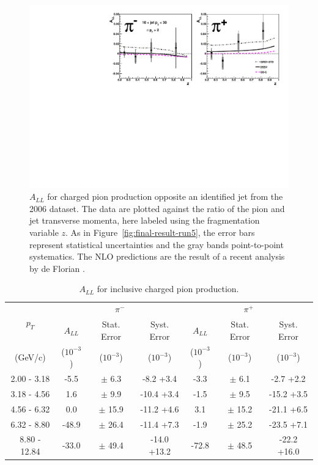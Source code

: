 \begin{figure}[]
  \includegraphics[width=1.0\textwidth]{figures/final-result-run6-4}
  \caption{$A_{LL}$ for charged pion production opposite an identified jet from the 2006 dataset.  The data are plotted against the ratio of the pion and jet transverse momenta, here labeled using the fragmentation variable $z$.  As in Figure~\ref{fig:final-result-run5}, the error bars represent statistical uncertainties and the gray bands point-to-point systematics.  The NLO predictions are the result of a recent analysis by de Florian \cite{deFlorian:2009fw}.}
  \label{fig:final-result-run6}
\end{figure}

\begin{table}
  \centering
  \begin{tabular}{|c||c|c|c||c|c|c|}
    \hline
    \multirow{2}{*}{$p_T$} & \multicolumn{3}{c||}{$\pi^{-}$} & \multicolumn{3}{c|}{$\pi^{+}$} \\
    \cline{2-7}
    & $A_{LL}$ & Stat. Error & Syst. Error &$A_{LL}$ & Stat. Error & Syst. Error\\
    (GeV/c) & ($10^{-3}$) & ($10^{-3}$) & ($10^{-3}$) & ($10^{-3}$) & ($10^{-3}$) & ($10^{-3}$) \\
    \hline
    \hline
    2.00 - 3.18 & -5.5 & $\pm$ 6.3 & -8.2 +3.4 &  -3.3 & $\pm$ 6.1 & -2.7 +2.2\\
    3.18 - 4.56 & 1.6 & $\pm$ 9.9 & -10.4 +3.4 &  -1.5 & $\pm$ 9.5 & -15.2 +3.5\\
    4.56 - 6.32 & 0.0 & $\pm$ 15.9 & -11.2 +4.6 &  3.1 & $\pm$ 15.2 & -21.1 +6.5\\
    6.32 - 8.80 & -48.9 & $\pm$ 26.4 & -11.4 +7.3 &  -1.9 & $\pm$ 25.2 & -23.5 +7.1\\
    8.80 - 12.84 & -33.0 & $\pm$ 49.4 & -14.0 +13.2 &  -72.8 & $\pm$ 48.5 & -22.2 +16.0\\
    \hline
  \end{tabular}
  \caption{$A_{LL}$ for inclusive charged pion production.}
  \label{tab:final-2005-result}
\end{table}

